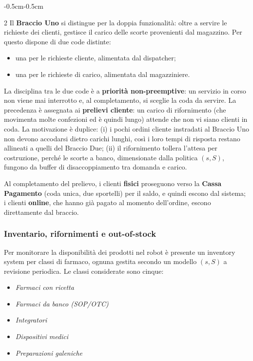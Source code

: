 \documentclass{article}
\begin{document}
\begin{adjustwidth}{-0.5cm}{-0.5cm}
\begin{multicols}{2}
Il \textbf{Braccio Uno} si distingue per la doppia funzionalità: oltre a servire le richieste dei
clienti, gestisce il carico delle scorte provenienti dal magazzino. Per questo dispone di due code
distinte:
\begin{itemize}
    \item[\ding{112}] una per le richieste cliente, alimentata dal dispatcher;
    \item[\ding{112}] una per le richieste di carico, alimentata dal magazziniere.
\end{itemize}
La disciplina tra le due code è a \textbf{priorità non-preemptive}: un servizio in corso non viene
mai interrotto e, al completamento, si sceglie la coda da servire. La precedenza è assegnata ai
\textbf{prelievi cliente}: un carico di rifornimento (che movimenta molte confezioni ed è quindi
lungo) attende che non vi siano clienti in coda. La motivazione è duplice: (i) i pochi ordini
cliente instradati al Braccio Uno non devono accodarsi dietro carichi lunghi, così i loro tempi di
risposta restano allineati a quelli del Braccio Due; (ii) il rifornimento tollera l'attesa per
costruzione, perché le scorte a banco,  dimensionate dalla politica $(s,S)$,  fungono da
buffer di disaccoppiamento tra domanda e carico.

Al completamento del prelievo, i clienti \textbf{fisici} proseguono verso la \textbf{Cassa
Pagamento} (coda unica, due sportelli) per il saldo, e quindi escono dal sistema; i clienti
\textbf{online}, che hanno già pagato al momento dell'ordine, escono direttamente dal braccio.

\subsubsection*{Inventario, rifornimenti e out-of-stock}
Per monitorare la disponibilità dei prodotti nel robot è presente un inventory system per classi
di farmaco, ognuna gestita secondo un modello $(s, S)$ a revisione periodica. Le classi
considerate sono cinque: 
\begin{itemize}
\item \emph{Farmaci con ricetta}
\item \emph{Farmaci da banco (SOP/OTC)}
\item \emph{Integratori}
\item \emph{Dispositivi medici}
\item \emph{Preparazioni galeniche}
\end{itemize}


\end{multicols}
\end{adjustwidth}
\end{document}
